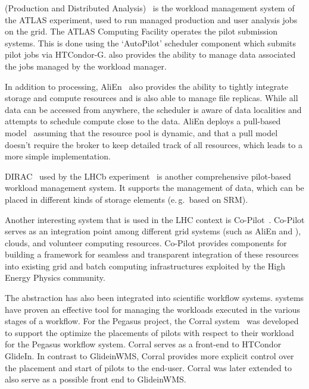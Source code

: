 \documentclass{sig-alternate}
\begin{document}
\panda (Production and Distributed Analysis)~\cite{zhao2011panda} is
the workload management system of the ATLAS experiment, used to run managed
production and user analysis jobs on the grid. The ATLAS Computing Facility
operates the pilot submission systems. This is done using the \panda `AutoPilot'
scheduler component which submits pilot jobs via HTCondor-G. \panda also
provides the ability to manage data associated the jobs managed by the \panda
workload manager.

In addition to processing, AliEn~\cite{saiz2003alien} also provides the
ability to tightly integrate storage and compute resources and is also able to
manage file replicas. While all data can be accessed from anywhere, the
scheduler is aware of data localities and attempts to schedule compute close to
the data. AliEn deploys a pull-based model~\cite{saiz2003alienpr} assuming that
the resource pool is dynamic, and that a pull model doesn't require the broker
to keep detailed track of all resources, which leads to a more simple
implementation.  

DIRAC~\cite{casajus2010dirac} used by the LHCb experiment~\cite{lhcb_url} is
another comprehensive pilot-based workload management system. It supports the
management of data, which can be placed in different kinds of storage elements
(e.\,g.\ based on SRM).

Another interesting \pilotjob system that is used in the LHC context is
Co-Pilot~\cite{buncicco2011co}. Co-Pilot serves as an integration point among
different grid \pilotjob systems (such as AliEn and \panda), clouds, and
volunteer computing resources. Co-Pilot provides components for building a
framework for seamless and transparent integration of these resources into
existing grid and batch computing infrastructures exploited by the High Energy
Physics community.


The \pilot abstraction has also been integrated into scientific workflow
systems. \pilotjob systems have proven an effective tool for managing the
workloads executed in the various stages of a workflow. For the Pegasus
project\cite{deelman2015}, the Corral system~\cite{rynge2011experiences} was
developed to support the optimize the placements of pilots with respect to their
workload for the Pegasus workflow system. Corral serves as a front-end to
HTCondor GlideIn. In contrast to GlideinWMS, Corral provides more explicit
control over the placement and start of pilots to the end-user. Corral was later
extended to also serve as a possible front end to GlideinWMS.
\end{document}
